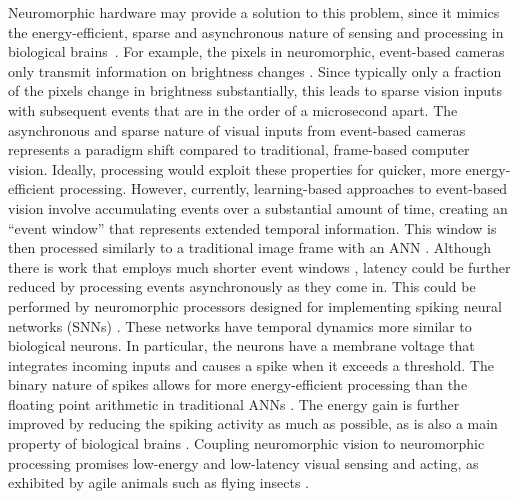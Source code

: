 Neuromorphic hardware may provide a solution to this problem, since it mimics the energy-efficient, sparse and asynchronous nature of sensing and processing in biological brains~\cite{indiveri2000neuromorphic,sandamirskaya2022neuromorphic}. For example, the pixels in neuromorphic, event-based cameras only transmit information on brightness changes \cite{gallego2020eventbased}. Since typically only a fraction of the pixels change in brightness substantially, this leads to sparse vision inputs with subsequent events that are in the order of a microsecond apart. The asynchronous and sparse nature of visual inputs from event-based cameras represents a paradigm shift compared to traditional, frame-based computer vision. Ideally, processing would exploit these properties for quicker, more energy-efficient processing. However, currently, learning-based approaches to event-based vision involve accumulating events over a substantial amount of time, creating an ``event window'' that represents extended temporal information. This window is then processed similarly to a traditional image frame with an ANN \cite{zhu2018evflownet,zhu2019unsupervised,gehrig2021eraft,paredes-valles2021back}.
Although there is work that employs much shorter event windows \cite{paredes-valles2020unsupervised,hagenaars2021selfsupervised,paredes-valles2023taming}, latency could be further reduced by processing events asynchronously as they come in. This could be performed by neuromorphic processors designed for implementing spiking neural networks (SNNs) \cite{maass1997networks,gruning2014spiking}. These networks have temporal dynamics more similar to biological neurons. In particular, the neurons have a membrane voltage that integrates incoming inputs and causes a spike when it exceeds a threshold. The binary nature of spikes allows for more energy-efficient processing than the floating point arithmetic in traditional ANNs \cite{davies2021advancing,ottati2023spike}. The energy gain is further improved by reducing the spiking activity as much as possible, as is also a main property of biological brains \cite{sterling2015principles}. Coupling neuromorphic vision to neuromorphic processing promises low-energy and low-latency visual sensing and acting, as exhibited by agile animals such as flying insects \cite{muijres2014flies}.

